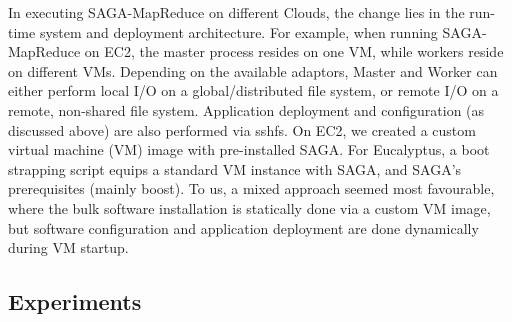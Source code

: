 \documentclass[3p,twocolumn]{elsarticle}
\newcommand{\sagamapreduce }{SAGA-MapReduce }
\begin{document}
In executing \sagamapreduce on different Clouds, the change lies in
the run-time system and deployment architecture. For example, when
running \sagamapreduce on EC2, the master process resides on one VM,
while workers reside on different VMs.  Depending on the available
adaptors, Master and Worker can either perform local I/O on a
global/distributed file system, or remote I/O on a remote, non-shared
file system.  %
Application deployment and configuration (as discussed above) are also
performed via sshfs.  On EC2, we created a custom virtual machine
(VM) image with pre-installed SAGA.  For Eucalyptus, a boot strapping
script equips a standard VM instance with SAGA, and SAGA's
prerequisites (mainly boost).  To us, a mixed approach seemed most
favourable, where the bulk software installation is statically done
via a custom VM image, but software configuration and application
deployment are done dynamically during VM startup.


\subsection{Experiments} 
\end{document}
